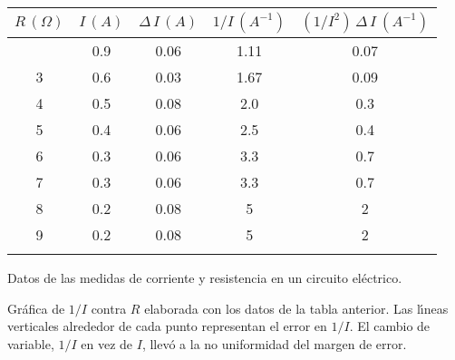 \documentclass[10pd,hyperref={colorlinks=true}]{beamer}
\begin{document}

 \begin{frame}{}

\begin{table}
\centering
\begin{tabular}{|c|c|c|c|c|}
\hline
$R\,(\Omega )$  &$I\,(A)$       &$\Delta\,I\,(A)$       &$1/I\,(A^{-1})$        &$(1/I^2)\,\Delta\,I\ (A^{-1})$ \\ \hline \firsthline
2               & 0.9           & 0.06                  &  1.11                 & 0.07  \\ \hline
3               & 0.6           & 0.03                  &  1.67                 & 0.09  \\ \hline
4               & 0.5           & 0.08                  &  2.0                  & 0.3   \\ \hline
5               & 0.4           & 0.06                  &  2.5                  & 0.4   \\ \hline
6               & 0.3           & 0.06                  &  3.3                  & 0.7   \\ \hline
7               & 0.3           & 0.06                  &  3.3                  & 0.7   \\ \hline
8               & 0.2           & 0.08                  &  5                    & 2     \\ \hline
9               & 0.2           & 0.08                  &  5                    & 2     \\ \lasthline
\end{tabular}
\centerline{Datos de las medidas de corriente y resistencia en un 
circuito el\'ectrico.}
\end{table}

 \end{frame}


 \begin{frame}{}

 \vfill
 \centerline{}
 \centerline{}
 \vfill

{Gr\'afica de $1/I$ contra $R$ elaborada con los datos de la tabla 
anterior. Las l\'{\i}neas verticales alrededor de cada punto representan 
el error en $1/I$. El cambio de variable, $1/I$ en vez de $I$, llev\'o a 
la no uniformidad del margen de error.}
 \vfill

 \end{frame}
\end{document}
